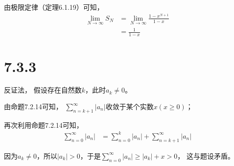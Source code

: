 \documentclass{article}
\theoremstyle{mystyle}
\begin{document}
由极限定律（定理6.1.19）可知，
\begin{align*}
  \lim \limits_{N \rightarrow \infty} S_N & = \lim \limits_{N \rightarrow \infty} \frac{1-x^{N+1}}{1-x} \\
                                          & = \frac{1}{1-x}
\end{align*}

\section*{7.3.3}

反证法， 假设存在自然数$k$，此时$a_k \neq 0$。

由命题7.2.14可知，
$\sum \limits_{n=k+1}^\infty |a_n|$收敛于某个实数$x(x \geq 0)$；

再次利用命题7.2.14可知，
\begin{align*}
  \sum \limits_{n=0}^\infty |a_n| & = \sum \limits_{n=0}^k |a_n| + \sum \limits_{n=k+1}^\infty |a_n|
\end{align*}

因为$a_k \neq 0$，所以$|a_k| > 0$，于是$\sum \limits_{n=0}^\infty |a_n| \geq |a_k| + x > 0$，
这与题设矛盾。
\end{document}

